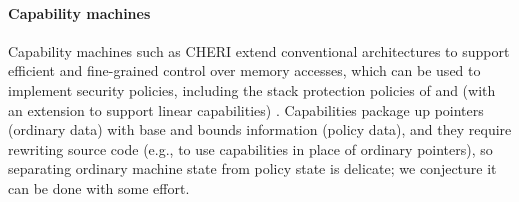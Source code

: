 \documentclass[acmsmall,review,anonymous]{acmart}\settopmatter{printfolios=true,printccs=false,printacmref=false}
\begin{document}
  \paragraph*{Capability machines}
  Capability machines such as CHERI \citep{Woodruff+14} extend conventional
  architectures to support efficient and fine-grained control over memory
  accesses, which can be used to implement security policies, including
  the stack protection policies of
  \citet{Skorstengaard+19b} and (with an extension to support linear capabilities) \citet{Skorstengaard+19}.
  Capabilities package up pointers
  (ordinary data) with base and bounds information (policy data),
  and they require rewriting source code (e.g., to use capabilities in place
  of ordinary pointers), so separating ordinary machine state from policy
  state is delicate; we conjecture it can be done with some effort.



\end{document}
